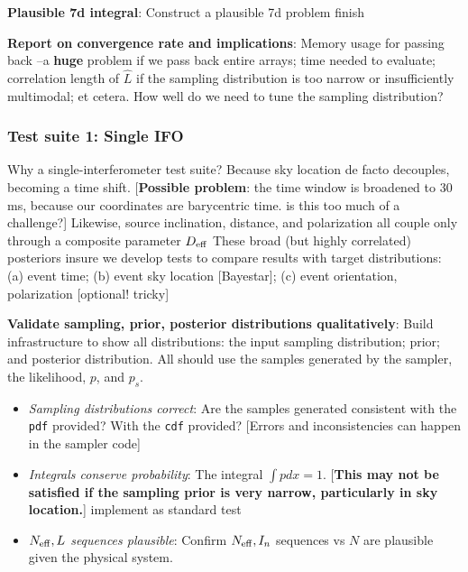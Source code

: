 \documentclass[twocolumn,prd,nofootinbib]{revtex4}
\newcommand\editremark[1]{{\color{red} #1}}
\begin{document}
\begin{widetext}
\noindent \textbf{Plausible 7d integral}: Construct a plausible 7d problem \editremark{finish}


\noindent \textbf{Report on convergence rate and implications}: Memory usage for passing back --a \textbf{huge} problem
if we pass back entire arrays; time needed to evaluate;
correlation length of $\hat{L}$ if the sampling distribution is too narrow or insufficiently multimodal; et cetera.  How well do we need to tune the sampling distribution?




\subsubsection{Test suite 1: Single IFO}

Why a single-interferometer test suite?  Because sky location de facto decouples, becoming a time
shift. [\textbf{Possible problem}: the time window is broadened to 30 ms, because our coordinates are barycentric
  time. \editremark{is this too much of a challenge?}] 
Likewise, source inclination, distance, and polarization all couple only through a composite parameter $D_{\rm eff}$
%
These broad (but highly correlated) posteriors insure we develop tests to compare results with target distributions: (a) event time; (b) event sky location [Bayestar]; (c)
event orientation, polarization [optional! tricky]


\noindent \textbf{Validate sampling, prior, posterior distributions qualitatively}: Build infrastructure to show all distributions:
the input sampling distribution; prior; and posterior distribution.  All should use the samples generated by the
sampler, the likelihood, $p$, and $p_s$.
\begin{itemize}
\item \emph{Sampling distributions correct}: Are the samples generated consistent with the \texttt{pdf} provided? With
  the \texttt{cdf} provided?  [Errors and inconsistencies can happen in the sampler code]

\item \emph{Integrals conserve probability}: The integral $\int p dx=1$.  [\textbf{This may not be satisfied if the
    sampling prior is very narrow, particularly in sky location.}] \editremark{implement as standard test}


\item \emph{$N_{\rm eff},L$ sequences plausible}: Confirm $N_{\rm eff},I_n$ sequences vs $N$ are plausible given the
  physical system.


\end{itemize}
\end{widetext}
\end{document}
